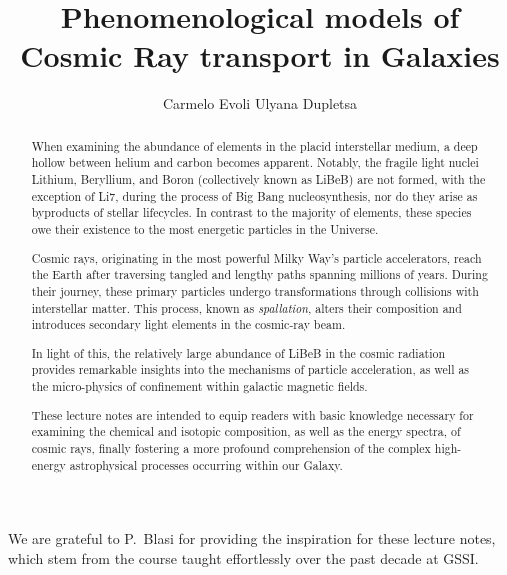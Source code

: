\documentclass[varenna]{cimento}
\title{Phenomenological models of Cosmic Ray transport in Galaxies}
\author{Carmelo Evoli \atque Ulyana Dupletsa}
\institute{Gran Sasso Science Institute, Viale Francesco Crispi 7, 67100 L'Aquila, Italy \\ INFN-Laboratori Nazionali del Gran Sasso (LNGS), via G. Acitelli 22, 67100 Assergi (AQ), Italy}
\begin{document}
\maketitle

\begin{abstract}
When examining the abundance of elements in the placid interstellar medium, a deep hollow between helium and carbon becomes apparent.
%
Notably, the fragile light nuclei Lithium, Beryllium, and Boron (collectively known as LiBeB) are not formed, with the exception of Li7, during the process of Big Bang nucleosynthesis, nor do they arise as byproducts of stellar lifecycles.
%
In contrast to the majority of elements, these species owe their existence to the most energetic particles in the Universe. 

Cosmic rays, originating in the most powerful Milky Way's particle accelerators, reach the Earth after traversing tangled and lengthy paths spanning millions of years.
% 
During their journey, these primary particles undergo transformations through collisions with interstellar matter. This process, known as \emph{spallation}, alters their composition and introduces secondary light elements in the cosmic-ray beam.

In light of this, the relatively large abundance of LiBeB in the cosmic radiation provides remarkable insights into the  mechanisms of particle acceleration, as well as the micro-physics of confinement within galactic magnetic fields.

These lecture notes are intended to equip readers with basic knowledge necessary for examining the chemical and isotopic composition, as well as the energy spectra, of cosmic rays, finally fostering a more profound comprehension of the complex high-energy astrophysical processes occurring within our Galaxy.
\end{abstract}











\appendix
    





\acknowledgments

We are grateful to P.~Blasi for providing the inspiration for these lecture notes, which stem from the course taught effortlessly over the past decade at GSSI.
\end{document}
